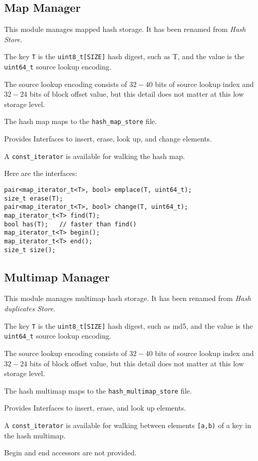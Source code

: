 \documentclass[12pt,twoside]{article}
\begin{document}
\subsection{Map Manager}
This module manages mapped hash storage.
It has been renamed from \textit{Hash Store}.
\begin{compactitem}
\item The key \texttt{T} is the \texttt{uint8\_t[SIZE]} hash digest,
such as T,
and the value is the \texttt{uint64\_t} source lookup encoding.
\item The source lookup encoding consists of $32-40$ bits
of source lookup index and $32-24$ bits of block offset value,
but this detail does not matter at this low storage level.
\item The hash map maps to the \texttt{hash\_map\_store} file.
\item Provides Interfaces to insert, erase, look up, and change elements.
\item A \texttt{const\_iterator} is available for walking the hash map.
\end{compactitem}

Here are the interfaces:
\begin{small}
\begin{verbatim}
pair<map_iterator_t<T>, bool> emplace(T, uint64_t);
size_t erase(T);
pair<map_iterator_t<T>, bool> change(T, uint64_t);
map_iterator_t<T> find(T);
bool has(T);   // faster than find()
map_iterator_t<T> begin();
map_iterator_t<T> end();
size_t size();
\end{verbatim}
\end{small}

\subsection{Multimap Manager}
This module manages multimap hash storage.
It has been renamed from \textit{Hash duplicates Store}.
\begin{compactitem}
\item The key \texttt{T} is the \texttt{uint8\_t[SIZE]} hash digest,
such as md5,
and the value is the \texttt{uint64\_t} source lookup encoding.
\item The source lookup encoding consists of $32-40$ bits
of source lookup index and $32-24$ bits of block offset value,
but this detail does not matter at this low storage level.
\item The hash multimap maps to the \texttt{hash\_multimap\_store} file.
\item Provides Interfaces to insert, erase, and look up elements.
\item A \texttt{const\_iterator} is available for walking
between elements \texttt{[a,b)} of a key in the hash multimap.
\item Begin and end accessors are not provided.
\end{compactitem}
\end{document}
